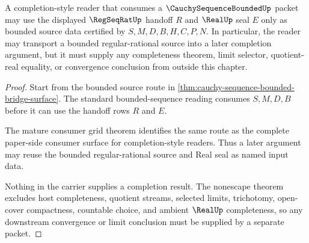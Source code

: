 \begin{theorem}
\label{thm:cauchy-sequence-bounded-completion-consumer-example}
A completion-style reader that consumes a $\CauchySequenceBoundedUp$ packet may use the displayed $\RegSeqRatUp$ handoff $R$ and $\RealUp$ seal $E$ only as bounded source data certified by $S,M,D,B,H,C,P,N$. In particular, the reader may transport a bounded regular-rational source into a later completion argument, but it must supply any completeness theorem, limit selector, quotient-real equality, or convergence conclusion from outside this chapter.
\end{theorem}
\begin{proof}
Start from the bounded source route in \autoref{thm:cauchy-sequence-bounded-bridge-surface}. The standard bounded-sequence reading consumes $S,M,D,B$ before it can use the handoff rows $R$ and $E$.

The mature consumer grid theorem identifies the same route as the complete paper-side consumer surface for completion-style readers. Thus a later argument may reuse the bounded regular-rational source and Real seal as named input data.

Nothing in the carrier supplies a completion result. The nonescape theorem excludes host completeness, quotient streams, selected limits, trichotomy, open-cover compactness, countable choice, and ambient $\RealUp$ completeness, so any downstream convergence or limit conclusion must be supplied by a separate packet.
\end{proof}


